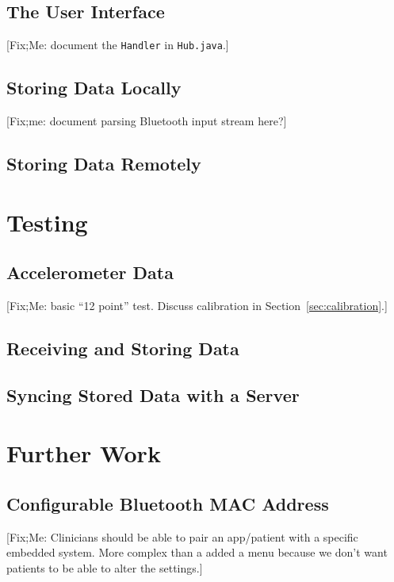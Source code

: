 \documentclass[11pt, a4paper, oneside, english]{scrbook}
\begin{document}
\section{The User Interface} %
\label{sec:the_user_interface}
[Fix;Me: document the \texttt{Handler} in \texttt{Hub.java}.]
\section{Storing Data Locally} %
\label{sec:storing_data_locally}
[Fix;me: document parsing Bluetooth input stream here?]
\section{Storing Data Remotely} %
\label{sec:storing_data_remotely}

\chapter{Testing} %
\label{cha:testing}
\section{Accelerometer Data} %
\label{sec:accelerometer_data}
[Fix;Me: basic ``12 point'' test. Discuss calibration in Section~\ref{sec:calibration}.]
\section{Receiving and Storing Data} %
\label{sec:receiving_data}

\section{Syncing Stored Data with a Server} %
\label{sec:syncing_stored_data_with_a_server}

\chapter{Further Work} %
\label{cha:further_work}
\section{Configurable Bluetooth MAC Address} %
\label{sec:configurable_bluetooth_mac_adress}
[Fix;Me: Clinicians should be able to pair an app/patient with a specific embedded system. More complex than a added a menu because we don't want patients to be able to alter the settings.]
\end{document}
